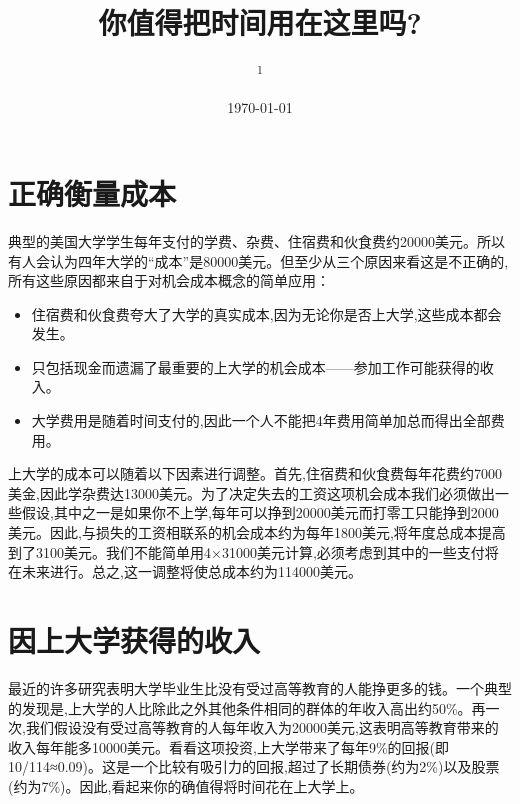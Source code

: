 \documentclass[10pt, a4paper]{ctexart} %
\title{你值得把时间用在这里吗?} %
\author{
	\authorstyle{鲁晓东\textsuperscript{1}} %
	\newline\newline %
	\textsuperscript{1}\institution{中山大学岭南学院经济学系}\\ %
}
\date{\today} %
\begin{document}
\maketitle %

\thispagestyle{firstpage} %


	
	





\section*{正确衡量成本}
典型的美国大学学生每年支付的学费、杂费、住宿费和伙食费约20000美元。所以有人会认为四年大学的“成本”是80000美元。但至少从三个原因来看这是不正确的,所有这些原因都来自于对机会成本概念的简单应用：
   \begin{itemize}
   	\item 住宿费和伙食费夸大了大学的真实成本,因为无论你是否上大学,这些成本都会发生。
   	\item 只包括现金而遗漏了最重要的上大学的机会成本——参加工作可能获得的收入。
   	\item 大学费用是随着时间支付的,因此一个人不能把4年费用简单加总而得出全部费用。
   \end{itemize}

上大学的成本可以随着以下因素进行调整。首先,住宿费和伙食费每年花费约7000美金,因此学杂费达13000美元。为了决定失去的工资这项机会成本我们必须做出一些假设,其中之一是如果你不上学,每年可以挣到20000美元而打零工只能挣到2000美元。因此,与损失的工资相联系的机会成本约为每年1800美元,将年度总成本提高到了3100美元。我们不能简单用4×31000美元计算,必须考虑到其中的一些支付将在未来进行。总之,这一调整将使总成本约为114000美元。

\section*{因上大学获得的收入}
最近的许多研究表明大学毕业生比没有受过高等教育的人能挣更多的钱。一个典型的发现是,上大学的人比除此之外其他条件相同的群体的年收入高出约50\%。再一次,我们假设没有受过高等教育的人每年收入为20000美元,这表明高等教育带来的收入每年能多10000美元。看看这项投资,上大学带来了每年9\%的回报(即10/114≈0.09)。这是一个比较有吸引力的回报,超过了长期债券(约为2\%)以及股票(约为7\%)。因此,看起来你的确值得将时间花在上大学上。
\end{document}
